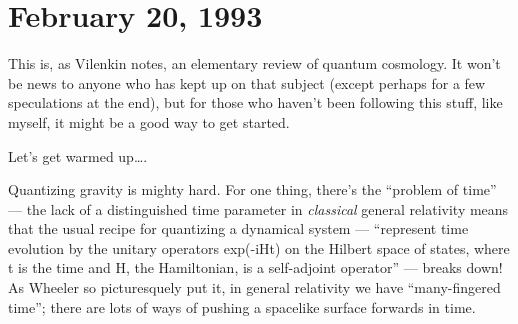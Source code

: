 \documentclass{article}
\def\tightlist{}
\renewcommand{\texttt}[1]{%
  \begingroup
  \ttfamily
  \begingroup\lccode`~=`/\lowercase{\endgroup\def~}{/\discretionary{}{}{}}%
  \begingroup\lccode`~=`[\lowercase{\endgroup\def~}{[\discretionary{}{}{}}%
  \begingroup\lccode`~=`.\lowercase{\endgroup\def~}{.\discretionary{}{}{}}%
  \catcode`/=\active\catcode`[=\active\catcode`.=\active
  \scantokens{#1\noexpand}%
  \endgroup
}
\begin{document}
\hypertarget{week6}{%
\section{February 20, 1993}\label{week6}}

\noindent
This is, as Vilenkin notes, an elementary review of quantum cosmology.
It won't be news to anyone who has kept up on that subject (except
perhaps for a few speculations at the end), but for those who haven't
been following this stuff, like myself, it might be a good way to get
started.

Let's get warmed up\ldots.

Quantizing gravity is mighty hard. For one thing, there's the ``problem
of time'' --- the lack of a distinguished time parameter in
\emph{classical} general relativity means that the usual recipe for
quantizing a dynamical system --- ``represent time evolution by the
unitary operators exp(-iHt) on the Hilbert space of states, where t is
the time and H, the Hamiltonian, is a self-adjoint operator'' --- breaks
down! As Wheeler so picturesquely put it, in general relativity we have
``many-fingered time''; there are lots of ways of pushing a spacelike
surface forwards in time.
\end{document}

